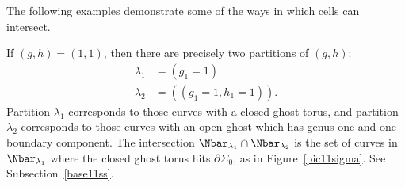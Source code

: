 The following examples demonstrate some of the ways in which cells can intersect.

\begin{example}
If $(g,h)=(1,1)$, then there are precisely two partitions of $(g,h)$: 
\begin{align*}
\lambda_1 & = (g_1=1)
\\
\lambda_2 & = ((g_1=1,h_1=1)).
\end{align*}
Partition $\lambda_1$ corresponds to those curves with a closed ghost torus, and partition $\lambda_2$ corresponds to those curves with an open ghost which has genus one and one boundary component. The intersection $\Nbar_{\lambda_1} \cap \Nbar_{\lambda_2}$ is the set of curves in $\Nbar_{\lambda_1}$ where the closed ghost torus hits $\partial\Sigma_0$, as in Figure~\ref{pic11sigma}. See Subsection~\ref{base11ss}.
\end{example}

